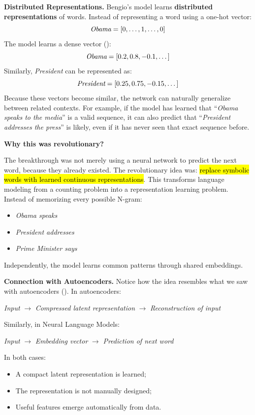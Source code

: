 \highspace
\textcolor{Green3}{ \textbf{Distributed Representations.}} Bengio's model learns \textbf{distributed representations} of words. Instead of representing a word using a one-hot vector:
\begin{equation*}
    \emph{Obama} = \left[0, \dots, 1, \dots, 0\right]
\end{equation*}
The model learns a dense vector ():
\begin{equation*}
    \emph{Obama} = \left[0.2, 0.8, -0.1, \dots\right]
\end{equation*}
Similarly, \emph{President} can be represented as:
\begin{equation*}
    \emph{President} = \left[0.25, 0.75, -0.15, \dots\right]
\end{equation*}
Because these vectors become similar, the network can naturally generalize between related contexts. For example, if the model has learned that ``\emph{Obama speaks to the media}'' is a valid sequence, it can also predict that ``\emph{President addresses the press}'' is likely, even if it has never seen that exact sequence before.

\highspace
\begin{flushleft}
    \textcolor{Green3}{ \textbf{Why this was revolutionary?}}
\end{flushleft}
The breakthrough was not merely using a neural network to predict the next word, because they already existed. The revolutionary idea was: \hl{replace symbolic words with learned continuous representations}. This transforms language modeling from a counting problem into a representation learning problem. Instead of memorizing every possible N-gram:
\begin{itemize}
    \item \emph{Obama speaks}
    \item \emph{President addresses}
    \item \emph{Prime Minister says}
\end{itemize}
Independently, the model learns common patterns through shared embeddings.

\highspace
\textcolor{Green3}{ \textbf{Connection with Autoencoders.}} Notice how the idea resembles what we saw with autoencoders (). In autoencoders:
\begin{center}
    \emph{Input} $\to$ \emph{Compressed latent representation} $\to$ \emph{Reconstruction of input}
\end{center}
Similarly, in Neural Language Models:
\begin{center}
    \emph{Input} $\to$ \emph{Embedding vector} $\to$ \emph{Prediction of next word}
\end{center}
In both cases:
\begin{itemize}
    \item A compact latent representation is learned;
    \item The representation is not manually designed;
    \item Useful features emerge automatically from data.
\end{itemize}